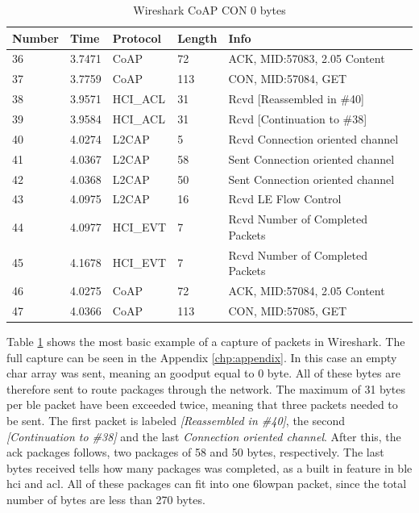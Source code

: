 \begin{table}[ht]
\centering
\caption{Wireshark CoAP CON 0 bytes}
\label{coapCON0table}
\begin{tabular}{lllll}
Number & Time   & Protocol & Length & Info                             \\ \hline
36     & 3.7471 & CoAP     & 72     & ACK, MID:57083, 2.05 Content     \\
37     & 3.7759 & CoAP     & 113    & CON, MID:57084, GET              \\
38     & 3.9571 & HCI\_ACL & 31     & Rcvd {[}Reassembled in \#40{]}   \\
39     & 3.9584 & HCI\_ACL & 31     & Rcvd {[}Continuation to \#38{]}  \\
40     & 4.0274 & L2CAP    & 5      & Rcvd Connection oriented channel \\
41     & 4.0367 & L2CAP    & 58     & Sent Connection oriented channel \\
42     & 4.0368 & L2CAP    & 50     & Sent Connection oriented channel \\
43     & 4.0975 & L2CAP    & 16     & Rcvd LE Flow Control             \\
44     & 4.0977 & HCI\_EVT & 7      & Rcvd Number of Completed Packets \\
45     & 4.1678 & HCI\_EVT & 7      & Rcvd Number of Completed Packets \\
46     & 4.0275 & CoAP     & 72     & ACK, MID:57084, 2.05 Content     \\
47     & 4.0366 & CoAP     & 113    & CON, MID:57085, GET              \\ \hline
\end{tabular}
\end{table}

Table \ref{coapCON0table} shows the most basic example of a capture of packets in Wireshark. The full capture can be seen in the Appendix \ref{chp:appendix}. In this case an empty char array was sent, meaning an goodput equal to 0 byte. All of these bytes are therefore sent to route packages through the network. The maximum of 31 bytes per \gls{ble} packet have been exceeded twice, meaning that three packets needed to be sent. The first packet is labeled \textit{[Reassembled in \#40]}, the second \textit{[Continuation to \#38]} and the last \textit{Connection oriented channel}. After this, the \gls{ack} packages follows, two packages of 58 and 50 bytes, respectively. The last bytes received tells how many packages was completed, as a built in feature in \gls{ble}  \gls{hci}  and \gls{acl}. All of these packages can fit into one \gls{6lowpan} packet, since the total number of bytes are less than 270 bytes. 

